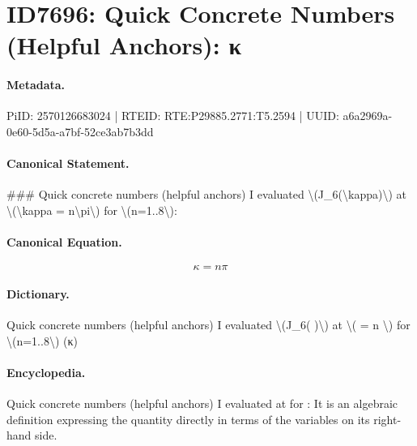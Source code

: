 \section*{ID7696: Quick Concrete Numbers (Helpful Anchors): κ}
\paragraph{Metadata.}
PiID: 2570126683024 | RTEID: RTE:P29885.2771:T5.2594 | UUID: a6a2969a-0e60-5d5a-a7bf-52ce3ab7b3dd

\paragraph{Canonical Statement.}
\#\#\# Quick concrete numbers (helpful anchors) I evaluated \textbackslash{}(J\_6(\textbackslash{}kappa)\textbackslash{}) at \textbackslash{}(\textbackslash{}kappa = n\textbackslash{}pi\textbackslash{}) for \textbackslash{}(n=1..8\textbackslash{}):

\paragraph{Canonical Equation.}
\[
\kappa = n\pi
\]

\paragraph{Dictionary.}
Quick concrete numbers (helpful anchors) I evaluated \textbackslash{}(J\_6( )\textbackslash{}) at \textbackslash{}( = n \textbackslash{}) for \textbackslash{}(n=1..8\textbackslash{}) (κ)

\paragraph{Encyclopedia.}
Quick concrete numbers (helpful anchors) I evaluated at for : It is an algebraic definition expressing the quantity directly in terms of the variables on its right-hand side.

